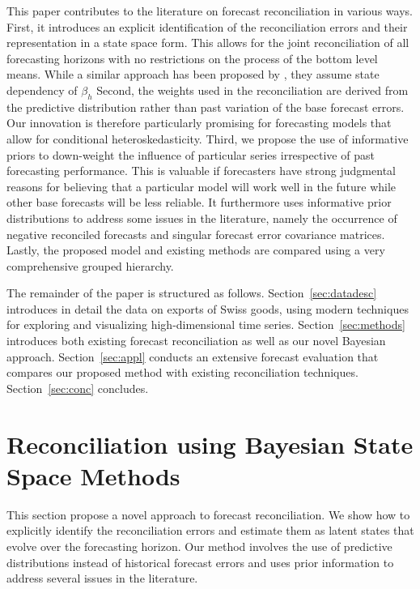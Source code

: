 \documentclass[a4paper,fleqn,11pt]{article}
\begin{document}
This paper contributes to the literature on forecast reconciliation in various ways. First, it introduces an explicit identification of the reconciliation errors and their representation in a state space form. This allows for the joint reconciliation of all forecasting horizons with no restrictions on the process of the bottom level means. While a similar approach has been proposed by \cite{Pennings2017}, they assume state dependency of $\beta_h$ Second, the weights used in the reconciliation are derived from the predictive distribution rather than past variation of the base forecast errors. Our innovation is therefore particularly promising for forecasting models that allow for conditional heteroskedasticity. Third, we propose the use of informative priors to down-weight the influence of particular series irrespective of past forecasting performance. This is valuable if forecasters have strong judgmental reasons for believing that a particular model will work well in the future while other base forecasts will be less reliable. It furthermore uses informative prior distributions to address some issues in the literature, namely the occurrence of negative reconciled forecasts and singular forecast error covariance matrices. Lastly, the proposed model and existing methods are compared using a very comprehensive grouped hierarchy.

The remainder of the paper is structured as follows. Section~\ref{sec:datadesc} introduces in detail the data on exports of Swiss goods, using modern techniques for exploring and visualizing high-dimensional time series. Section~\ref{sec:methods} introduces both existing forecast reconciliation as well as our novel Bayesian approach. Section~\ref{sec:appl} conducts an extensive forecast evaluation that compares our proposed method with existing reconciliation techniques. Section~\ref{sec:conc} concludes.






\section{Reconciliation using Bayesian State Space Methods}\label{sec:model}

This section propose a novel approach to forecast reconciliation. We show how to explicitly identify the reconciliation errors and estimate them as latent states that evolve over the forecasting horizon. Our method involves the use of predictive distributions instead of historical forecast errors and uses prior information to address several issues in the literature. 
\end{document}
